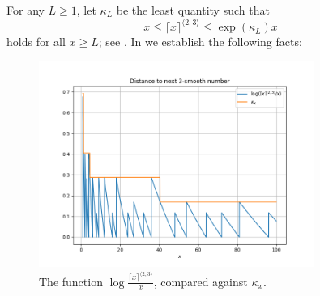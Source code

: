 \documentclass[12pt,a4paper,reqno]{amsart}
\numberwithin{equation}{section}
\theoremstyle{plain}
\theoremstyle{definition}
\begin{document}
For any $L \geq 1$, let $\kappa_L$ be the least quantity such that
\begin{equation}\label{kappa-def}  
  x \leq \lceil x \rceil^{\langle 2,3\rangle} \leq \exp(\kappa_L) x 
\end{equation}
holds for all $x \geq L$; see .  In  we establish the following facts:

\begin{figure}
  \centering
  \includegraphics[width=0.8\textwidth]{next_smooth.png}
  \vspace{-8pt}
  \caption{The function $\log \frac{\lceil x \rceil^{\langle 2,3 \rangle}}{x}$, compared against $\kappa_x$. 
  }\label{fig:nextsmooth}
  \end{figure}
\end{document}
